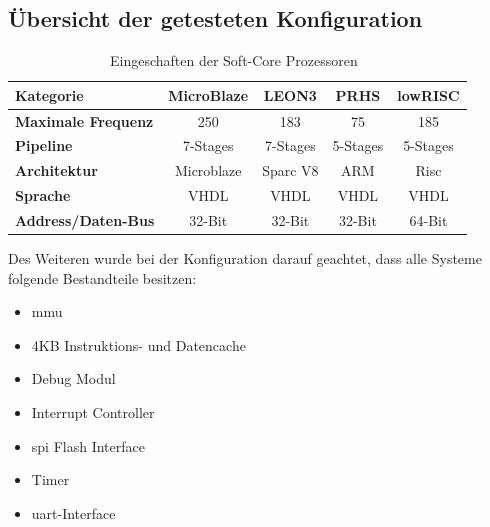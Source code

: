 \subsection{Übersicht der getesteten Konfiguration}\label{kap:getestetekonfiguration}


\begin{table}[H]
\centering
\begin{tabular}{|l|c|c|c|c|}
  \hline
  \textbf{Kategorie} & \textbf{MicroBlaze} & \textbf{LEON3}& \textbf{PRHS}& \textbf{lowRISC}\\
  \hline
  \textbf{Maximale Frequenz} &250 & 183 & 75 & 185\\
  \hline
  \textbf{Pipeline} & 7-Stages & 7-Stages & 5-Stages & 5-Stages\\
  \hline
  \textbf{Architektur} & Microblaze & Sparc V8  & ARM &  Risc\\
  \hline
  \textbf{Sprache} & VHDL & VHDL & VHDL & VHDL\\
    \hline
  \textbf{Address/Daten-Bus} & 32-Bit & 32-Bit & 32-Bit & 64-Bit\\
      \hline
\end{tabular}
  \caption{Eingeschaften der Soft-Core Prozessoren~\cite{comparison}}
 \label{tab:features}
  \end{table}

Des Weiteren wurde bei der Konfiguration darauf geachtet, dass alle Systeme folgende Bestandteile besitzen:\\
\begin{itemize}
  \item \ac{mmu}
  \item 4KB Instruktions- und Datencache
  \item Debug Modul
  \item Interrupt Controller
  \item \ac{spi} Flash Interface
  \item Timer
  \item \ac{uart}-Interface
\end{itemize}

